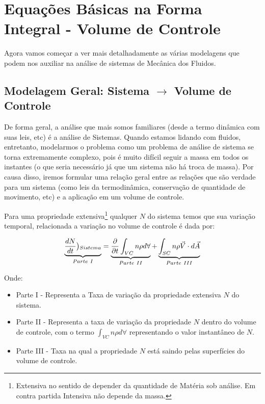 \documentclass{article}
\begin{document}
\newpage


\section{Equações Básicas na Forma Integral - Volume de Controle }
Agora vamos começar a ver mais detalhadamente as várias modelagens que podem nos auxiliar na análise de sistemas de Mecânica dos Fluidos.

\subsection{Modelagem Geral: Sistema $\rightarrow$ Volume de Controle}
De forma geral, a análise que mais somos familiares (desde a termo dinâmica com suas leis, etc) é a análise de Sistemas. Quando estamos lidando com fluidos, entretanto, modelarmos o problema como um
problema de análise de sistema se torna extremamente complexo, pois é muito difícil seguir a massa em todos os instantes (o que seria necessário já que um sistema não há troca de massa).
Por causa disso, iremos formular uma relação geral entre as relações que são verdade para um sistema (como leis da termodinâmica, conservação de quantidade de movimento, etc) e a aplicação em
um volume de controle.

Para uma propriedade extensiva\footnote{Extensiva no sentido de depender da quantidade de Matéria sob análise. Em contra partida Intensiva não depende da massa.} qualquer $N$ do sistema
temos que sua variação temporal, relacionada a variação no volume de controle é dada por:


\begin{align}
    \underbrace{\frac{dN}{dt}\big{)_{Sistema}}}_{Parte \ I} = \underbrace{\frac{\partial }{\partial t} \int_{VC} n \rho d \forall}_{Parte \ II} + \underbrace{\int_{SC} n \rho \vec V \cdot d \vec A}_{Parte \ III}
\end{align}

Onde:
\begin{itemize}
    \item Parte I - Representa a Taxa de variação da propriedade extensiva $N$ do sistema.
    \item Parte II - Representa a taxa de variação da propriedade $N$ dentro do volume de controle, com o termo $\int_{VC} n \rho d \forall$ representando o valor instantâneo de $N$.
    \item Parte III - Taxa na qual a propriedade $N$ está saindo pelas superfícies do volume de controle.
\end{itemize}
\end{document}
